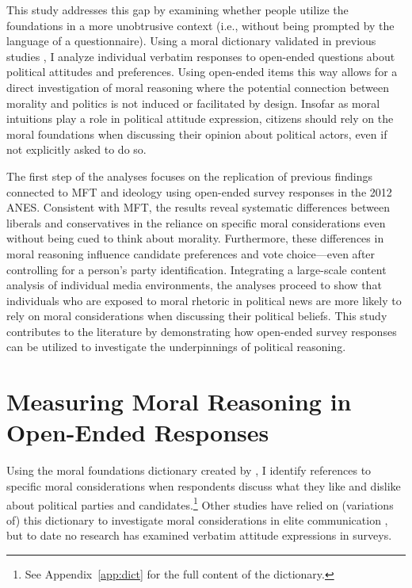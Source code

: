 \documentclass[12pt]{article}
\begin{document}
This study addresses this gap by examining whether people utilize the foundations in a more unobtrusive context (i.e., without being prompted by the language of a questionnaire). Using a moral dictionary validated in previous studies \citep[e.g.,][]{graham2009liberals}, I analyze individual verbatim responses to open-ended questions about political attitudes and preferences. Using open-ended items this way allows for a direct investigation of moral reasoning where the potential connection between morality and politics is not induced or facilitated by design. Insofar as moral intuitions play a role in political attitude expression, citizens should rely on the moral foundations when discussing their opinion about political actors, even if not explicitly asked to do so. 

The first step of the analyses focuses on the replication of previous findings connected to MFT and ideology using open-ended survey responses in the 2012 ANES. Consistent with MFT, the results reveal systematic differences between liberals and conservatives in the reliance on specific moral considerations even without being cued to think about morality. Furthermore, these differences in moral reasoning influence candidate preferences and vote choice---even after controlling for a person's party identification. Integrating a large-scale content analysis of individual media environments, the analyses proceed to show that individuals who are exposed to moral rhetoric in political news are more likely to rely on moral considerations when discussing their political beliefs. This study contributes to the literature by demonstrating how open-ended survey responses can be utilized to investigate the underpinnings of political reasoning.


\section*{Measuring Moral Reasoning in Open-Ended Responses}

Using the moral foundations dictionary created by \citet{graham2009liberals}, I identify references to specific moral considerations when respondents discuss what they like and dislike about political parties and candidates.\footnote{See Appendix~\ref{app:dict} for the full content of the dictionary.} Other studies have relied on (variations of) this dictionary to investigate moral considerations in elite communication \citep[e.g.][]{clifford2015concerns}, but to date no research has examined verbatim attitude expressions in surveys.
\end{document}
